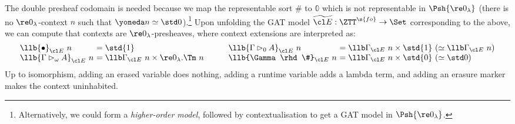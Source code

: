The double presheaf codomain is needed because we map the representable sort
$\#$ to $\mathbb{0}$ which is not representable in $\Psh{\re 0_\lambda}$ (there
is no $\re 0_\lambda$-context $n$ such that $\yoneda n \simeq \std 0$).\footnote{Alternatively, we could form a
\emph{higher-order model}, followed by contextualisation \cite{Bocquet2023-bu}
to get a GAT model in $\Psh{\re 0 _\lambda}$.} Upon unfolding the GAT model
$\widetilde{\cl E} : \ZTT^{\s{fo}} \to \Set$ corresponding to the
above, we can compute that contexts are ${\re 0_\lambda}$-presheaves, where
context extensions are interpreted as:
\[\begin{array}{c@{\qquad}c}
  \begin{array}{l@{\ }l}
    \llb{\bullet}_{\cl E}\ n & = \std{1}  \\
    \llb{\Gamma \rhd_\omega A}_{\cl E}\ n & = \llb\Gamma_{\cl E}\ n \times {\re 0_\lambda}.\Tm\ n
  \end{array}
  &
  \begin{array}{l@{\ }l}
    \llb{\Gamma \rhd_0 A}_{\cl E}\ n & = \llb\Gamma_{\cl E}\ n \times \std{1}\ (\simeq \llb\Gamma_{\cl E}\ n) \\
    \llb{\Gamma \rhd \#}_{\cl E}\ n & = \llb\Gamma_{\cl E}\ n \times \std{0}\ (\simeq \std 0)
  \end{array}
\end{array}\]
Up to isomorphism, adding an erased variable does nothing, adding a runtime
variable adds a lambda term, and adding an erasure marker makes the context
uninhabited.
  
